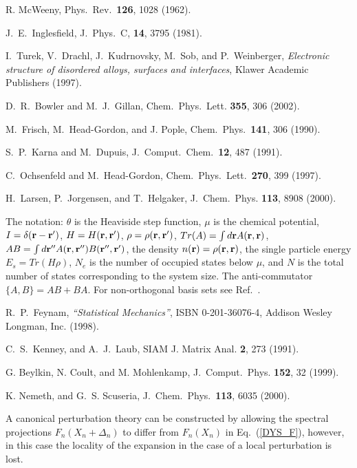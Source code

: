 \begin{references}
 R. McWeeny, 
Phys.\ Rev.\ {\bf 126}, 1028 (1962).

 J.\ E.\ Inglesfield,
J.\ Phys.\ C, {\bf 14}, 3795 (1981).

   I.\ Turek, V.\ Drachl, J.\ Kudrnovsky, M.\ Sob, and
P.\ Weinberger, {\it Electronic structure of disordered alloys, surfaces
and interfaces}, Klawer Academic Publishers (1997). 


 D.\ R.\ Bowler and M.\ J.\ Gillan,
Chem.\ Phys.\ Lett. {\bf 355}, 306 (2002).

 M.\ Frisch, M.\ Head-Gordon, and J. Pople,
Chem.\ Phys.\ {\bf 141}, 306 (1990).

 S.\ P.\ Karna and M.\ Dupuis,
J.\ Comput.\ Chem.\ {\bf 12}, 487 (1991).

 C.\ Ochsenfeld and M.\ Head-Gordon,
Chem.\ Phys.\ Lett.\ {\bf 270}, 399 (1997).

 H.\ Larsen, P.\ Jorgensen, and T.\ Helgaker,
J.\ Chem.\ Phys. {\bf 113}, 8908 (2000).

 The notation: $\theta$ is the Heaviside step function,
$\mu$ is the chemical potential, 
$I = \delta({\bf r-r'})$, $H = H({\bf r,r'})$, $\rho = \rho({\bf r,r'})$,
$Tr(A) = \int d{\bf r} A({\bf r,r})$, $AB = \int d{\bf r''} A({\bf r,r''})B(\bf r'',r')$,
the density $n({\bf r}) = \rho({\bf r,r})$, the single particle energy $E_s = Tr(H\rho)$,
$N_e$ is the number of occupied states below $\mu$, and 
$N$ is the total number of states corresponding to the system size.
The anti-commutator $\{A,B\} = AB+BA$.
For non-orthogonal basis sets see Ref.\ \cite{Challa99}.

 R.\ P.\ Feynam, {\em ``Statistical Mechanics''},
ISBN 0-201-36076-4, Addison Wesley Longman, Inc. (1998).

 C.\ S.\ Kenney, and A.\ J.\ Laub,
SIAM J. Matrix Anal. {\bf 2}, 273 (1991).

 G. Beylkin, N. Coult, and M. Mohlenkamp,
J.\ Comput.\ Phys. {\bf 152}, 32 (1999).

 K. Nemeth, and G.\ S. Scuseria,
J.\ Chem.\ Phys.\ {\bf 113}, 6035 (2000).

 A canonical perturbation theory can be constructed
by allowing the spectral projections $F_n(X_n+\Delta_n)$ to differ
from $F_n(X_n)$ in Eq.\ (\ref{DYS_F}), however, in this case the
locality of the expansion in the case of a local perturbation is lost.


\end{references}
